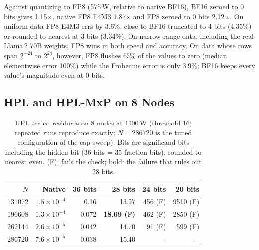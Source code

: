 \documentclass[conference]{IEEEtran}
\newcommand{\W}{\,W}
\newcommand{\ee}[2]{#1{\times}10^{#2}}  %
\newcommand{\pct}{\%}
\begin{document}
Against quantizing to FP8 (575\W, relative to native BF16), BF16 zeroed to 0 bits gives 1.15$\times$, native FP8
E4M3 1.87$\times$ and FP8 zeroed to 0 bits 2.12$\times$. On uniform data FP8 E4M3 errs by 3.6\pct, close to
BF16 truncated to 4 bits (4.35\pct) or rounded to nearest at 3 bits (3.34\pct). On narrow-range data, including
the real Llama\,2 70B weights, FP8 wins in both speed and accuracy. On data whose rows span $2^{-24}$ to $2^{24}$,
however, FP8 flushes 63\pct{} of the values to zero (median elementwise error 100\pct) while the Frobenius error is
only 3.9\pct; BF16 keeps every value's magnitude even at 0 bits.

\subsection{HPL and HPL-MxP on 8 Nodes}\label{sec:hpl}

\begin{table}[t]
\caption{HPL scaled residuals on 8 nodes at 1000\W{} (threshold 16; repeated runs reproduce exactly; $N=286720$ is the
tuned configuration of the cap sweep). Bits are
significand bits including the hidden bit (36 bits = 35 fraction bits), rounded to nearest even. (F): fails the
check; bold: the failure that rules out 28 bits.}\label{tab:hpl}
\centering\footnotesize\setlength{\tabcolsep}{4pt}
\begin{tabular}{@{}rrrrrr@{}}
\toprule
$N$ & Native & 36 bits & 28 bits & 24 bits & 20 bits \\
\midrule
131072 & $\ee{1.5}{-4}$ & 0.16 & 13.97 & 456 (F) & 9510 (F) \\
196608 & $\ee{1.3}{-4}$ & 0.072 & \textbf{18.09 (F)} & 462 (F) & 2850 (F) \\
262144 & $\ee{2.6}{-5}$ & 0.042 & 14.70 & 91 (F) & 599 (F) \\
286720 & $\ee{7.6}{-5}$ & 0.038 & 15.40 & --- & --- \\
\bottomrule
\end{tabular}
\end{table}
\end{document}

